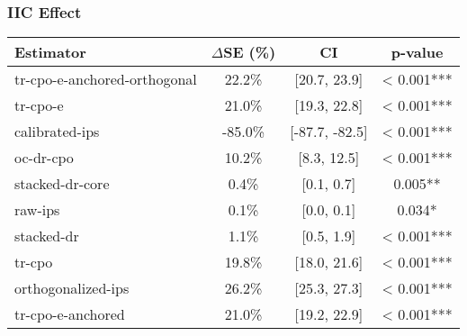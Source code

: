 \subsubsection{IIC Effect}
\begin{tabular}{l|ccc}
\toprule
Estimator & $\Delta$SE (\%) & CI & p-value \\
\midrule
tr-cpo-e-anchored-orthogonal & 22.2\% & [20.7, 23.9] & < 0.001*** \\
tr-cpo-e & 21.0\% & [19.3, 22.8] & < 0.001*** \\
calibrated-ips & -85.0\% & [-87.7, -82.5] & < 0.001*** \\
oc-dr-cpo & 10.2\% & [8.3, 12.5] & < 0.001*** \\
stacked-dr-core & 0.4\% & [0.1, 0.7] & 0.005** \\
raw-ips & 0.1\% & [0.0, 0.1] & 0.034* \\
stacked-dr & 1.1\% & [0.5, 1.9] & < 0.001*** \\
tr-cpo & 19.8\% & [18.0, 21.6] & < 0.001*** \\
orthogonalized-ips & 26.2\% & [25.3, 27.3] & < 0.001*** \\
tr-cpo-e-anchored & 21.0\% & [19.2, 22.9] & < 0.001*** \\
\bottomrule
\end{tabular}
